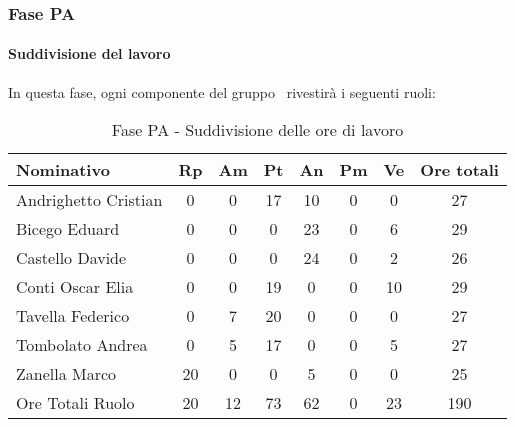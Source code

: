 \documentclass[../PianoProgetto.tex]{subfiles}
\begin{document}
	\subsubsection{Fase PA}
				\paragraph{Suddivisione del lavoro}
					In questa fase, ogni componente del gruppo \leaf\ rivestirà i seguenti ruoli:
	
					\begin{table}[h]
		\centering
	
		\begin{tabular}{l * {7}{c}}
			\toprule
			Nominativo & Rp & Am & Pt & An & Pm & Ve & Ore totali \\
			\midrule
			Andrighetto Cristian & 0 & 0 &	17 & 10 & 0 & 0 & 27 \\
			\midrule
			Bicego Eduard & 0 & 0 & 0 & 23 & 0 & 6 & 29 \\
			\midrule
			Castello Davide & 0 & 0 & 0 & 24 & 0 & 2 & 26 \\
			\midrule
			Conti Oscar Elia & 0 & 0 &	19 & 0 & 0 & 10 & 29 \\
			\midrule
			Tavella Federico &	0 & 7 & 20 & 0 & 0 & 0 & 27 \\
			\midrule
			Tombolato Andrea & 0 & 5 &	17 & 0 & 0 & 5 & 27 \\
			\midrule
			Zanella Marco & 20 & 0 & 0 & 5 & 0 & 0 & 25 \\
			\midrule			
			Ore Totali Ruolo & 20 & 12 & 73 & 62 & 0 & 23 & 190 \\
			\bottomrule
			
		\end{tabular}
		
		\caption{Fase PA - Suddivisione delle ore di lavoro}
		\label{tab:fasePA_ore}
		
	\end{table}
	
\end{document}
